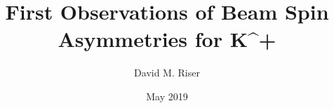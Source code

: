 \title{First Observations of Beam Spin Asymmetries for K^+}
\author{David M. Riser}
\date{May 2019}

